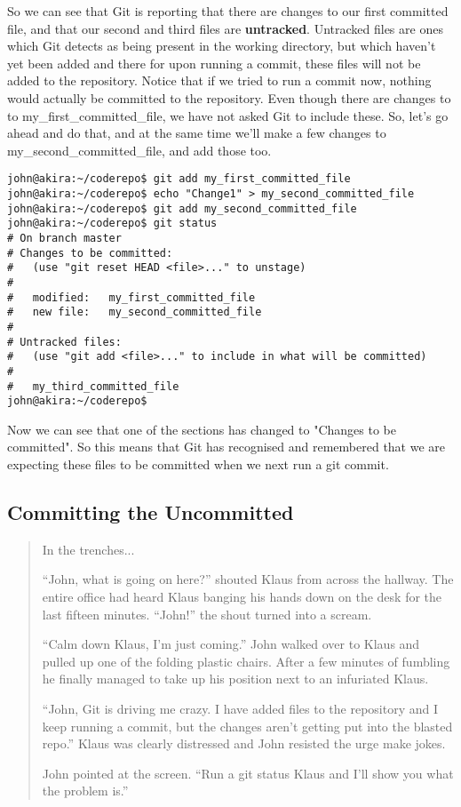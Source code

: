 So we can see that Git is reporting that there are changes to our first committed file, and that our second and third files are \textbf{untracked}.  Untracked files are ones which Git detects as being present in the working directory, but which haven't yet been added and there for upon running a commit, these files will not be added to the repository.  Notice that if we tried to run a commit now, nothing would actually be committed to the repository.  Even though there are changes to to my\_first\_committed\_file, we have not asked Git to include these.  So, let's go ahead and do that, and at the same time we'll make a few changes to my\_second\_committed\_file, and add those too.

\begin{verbatim} 
john@akira:~/coderepo$ git add my_first_committed_file
john@akira:~/coderepo$ echo "Change1" > my_second_committed_file 
john@akira:~/coderepo$ git add my_second_committed_file
john@akira:~/coderepo$ git status
# On branch master
# Changes to be committed:
#   (use "git reset HEAD <file>..." to unstage)
#
#	modified:   my_first_committed_file
#	new file:   my_second_committed_file
#
# Untracked files:
#   (use "git add <file>..." to include in what will be committed)
#
#	my_third_committed_file
john@akira:~/coderepo$ 
\end{verbatim} 

Now we can see that one of the sections has changed to "Changes to be committed".  So this means that Git has recognised and remembered that we are expecting these files to be committed when we next run a git commit.  

\subsection*{Committing the Uncommitted}

\begin{quote}In the trenches...

``John, what is going on here?'' shouted Klaus from across the hallway.  The entire office had heard Klaus banging his hands down on the desk for the last fifteen minutes.  ``John!'' the shout turned into a scream.

``Calm down Klaus, I'm just coming.''  John walked over to Klaus and pulled up one of the folding plastic chairs.  After a few minutes of fumbling he finally managed to take up his position next to an infuriated Klaus.

``John, Git is driving me crazy.  I have added files to the repository and I keep running a commit, but the changes aren't getting put into the blasted repo.''  Klaus was clearly distressed and John resisted the urge make jokes.

John pointed at the screen.  ``Run a git status Klaus and I'll show you what the problem is.''
\end{quote}

